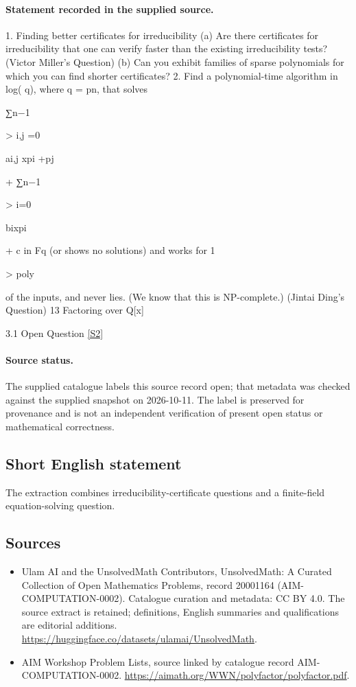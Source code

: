 \documentclass[11pt]{article}
\begin{document}
\paragraph{Statement recorded in the supplied source.}
1. Finding better certificates for irreducibility (a) Are there certificates for irreducibility that one can verify faster than the existing irreducibility tests? (Victor Miller's Question) (b) Can you exhibit families of sparse polynomials for which you can find shorter certificates? 2. Find a polynomial-time algorithm in log( q), where q = pn, that solves

∑n−1

> i,j =0

ai,j xpi +pj

+ ∑n−1

> i=0

bixpi

+ c in Fq (or shows no solutions) and works for 1

> poly

of the inputs, and never lies. (We know that this is NP-complete.) (Jintai Ding's Question) 13 Factoring over Q[x]

3.1 Open
Question \href{https://aimath.org/WWN/polyfactor/polyfactor.pdf}{[S2]}
\paragraph{Source status.}
The supplied catalogue labels this source record open; that metadata was checked against the supplied snapshot on 2026-10-11. The label is preserved for provenance and is not an independent verification of present open status or mathematical correctness.
\subsection{Short English statement}
The extraction combines irreducibility-certificate questions and a finite-field equation-solving question.
\subsection{Sources}
\begin{itemize}
\item[S1] Ulam AI and the UnsolvedMath Contributors, UnsolvedMath: A Curated Collection of Open Mathematics Problems, record 20001164 (AIM-COMPUTATION-0002). Catalogue curation and metadata: CC BY 4.0. The source extract is retained; definitions, English summaries and qualifications are editorial additions.
\url{https://huggingface.co/datasets/ulamai/UnsolvedMath}.
\item[S2] AIM Workshop Problem Lists, source linked by catalogue record AIM-COMPUTATION-0002.
\url{https://aimath.org/WWN/polyfactor/polyfactor.pdf}.
\end{itemize}
\end{document}

